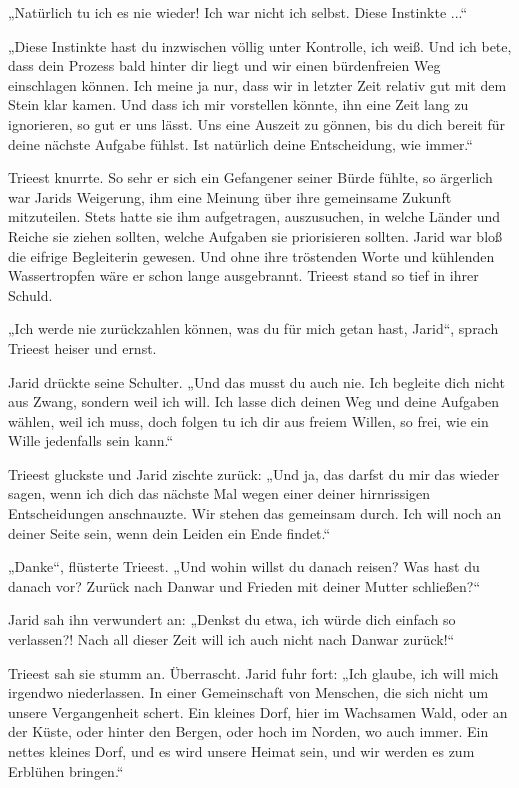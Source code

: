 „Natürlich tu ich es nie wieder! Ich war nicht ich selbst. Diese Instinkte ...“

„Diese Instinkte hast du inzwischen völlig unter Kontrolle, ich weiß. Und ich bete, dass dein Prozess bald hinter dir liegt und wir einen bürdenfreien Weg einschlagen können. Ich meine ja nur, dass wir in letzter Zeit relativ gut mit dem Stein klar kamen. Und dass ich mir vorstellen könnte, ihn eine Zeit lang zu ignorieren, so gut er uns lässt. Uns eine Auszeit zu gönnen, bis du dich bereit für deine nächste Aufgabe fühlst. Ist natürlich deine Entscheidung, wie immer.“

Trieest knurrte. So sehr er sich ein Gefangener seiner Bürde fühlte, so ärgerlich war Jarids Weigerung, ihm eine Meinung über ihre gemeinsame Zukunft mitzuteilen. Stets hatte sie ihm aufgetragen, auszusuchen, in welche Länder und Reiche sie ziehen sollten, welche Aufgaben sie priorisieren sollten. Jarid war bloß die eifrige Begleiterin gewesen. Und ohne ihre tröstenden Worte und kühlenden Wassertropfen wäre er schon lange ausgebrannt. Trieest stand so tief in ihrer Schuld.

„Ich werde nie zurückzahlen können, was du für mich getan hast, Jarid“, sprach Trieest heiser und ernst.

Jarid drückte seine Schulter. „Und das musst du auch nie. Ich begleite dich nicht aus Zwang, sondern weil ich will. Ich lasse dich deinen Weg und deine Aufgaben wählen, weil ich muss, doch folgen tu ich dir aus freiem Willen, so frei, wie ein Wille jedenfalls sein kann.“

Trieest gluckste und Jarid zischte zurück: „Und ja, das darfst du mir das wieder sagen, wenn ich dich das nächste Mal wegen einer deiner hirnrissigen Entscheidungen anschnauzte. Wir stehen das gemeinsam durch. Ich will noch an deiner Seite sein, wenn dein Leiden ein Ende findet.“

„Danke“, flüsterte Trieest. „Und wohin willst du danach reisen? Was hast du danach vor? Zurück nach Danwar und Frieden mit deiner Mutter schließen?“

Jarid sah ihn verwundert an: „Denkst du etwa, ich würde dich einfach so verlassen?! Nach all dieser Zeit will ich auch nicht nach Danwar zurück!“

Trieest sah sie stumm an. Überrascht. Jarid fuhr fort: „Ich glaube, ich will mich irgendwo niederlassen. In einer Gemeinschaft von Menschen, die sich nicht um unsere Vergangenheit schert. Ein kleines Dorf, hier im Wachsamen Wald, oder an der Küste, oder hinter den Bergen, oder hoch im Norden, wo auch immer. Ein nettes kleines Dorf, und es wird unsere Heimat sein, und wir werden es zum Erblühen bringen.“

